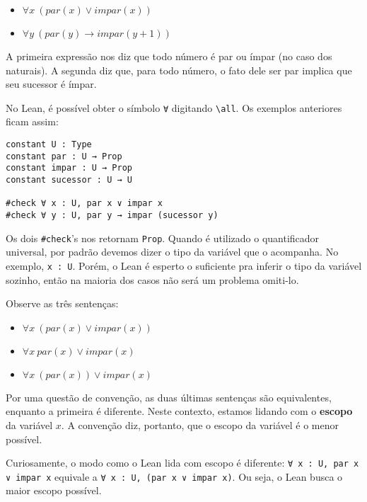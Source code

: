         \begin{itemize}
            \item $\forall x \ (par(x) \lor impar(x))$
            \item $\forall y \ (par(y) \rightarrow impar(y + 1))$
        \end{itemize}

        A primeira expressão nos diz que todo número é par ou ímpar (no caso dos naturais).
        A segunda diz que, para todo número, o fato dele ser par implica que seu sucessor é ímpar.
        
        No Lean, é possível obter o símbolo \lstinline{∀} digitando \lstinline{\all}. Os exemplos anteriores ficam assim:

        \begin{lstlisting}
constant U : Type
constant par : U → Prop
constant impar : U → Prop
constant sucessor : U → U

#check ∀ x : U, par x ∨ impar x
#check ∀ y : U, par y → impar (sucessor y)
\end{lstlisting}

        Os dois \lstinline{#check}'s nos retornam \lstinline{Prop}. Quando é utilizado o quantificador universal,
        por padrão devemos dizer o tipo da variável que o acompanha. No exemplo, \lstinline{x : U}. Porém, o Lean é
        esperto o suficiente pra inferir o tipo da variável sozinho, então na maioria dos casos não será um problema omiti-lo.

        Observe as três sentenças:

        \begin{itemize}
            \item $\forall x \ (par(x) \lor impar(x))$
            \item $\forall x \ par(x) \lor impar(x)$
            \item $\forall x \ (par(x)) \lor impar(x)$
        \end{itemize}

        Por uma questão de convenção, as duas últimas sentenças são equivalentes, enquanto a primeira é diferente.
        Neste contexto, estamos lidando com o \textbf{escopo} da variável $x$. A convenção diz, portanto, que o escopo da variável é o menor possível.
        
        Curiosamente, o modo como o Lean lida com escopo é diferente: \lstinline{∀ x : U, par x ∨ impar x} equivale a \lstinline{∀ x : U, (par x ∨ impar x)}.
        Ou seja, o Lean busca o maior escopo possível.


